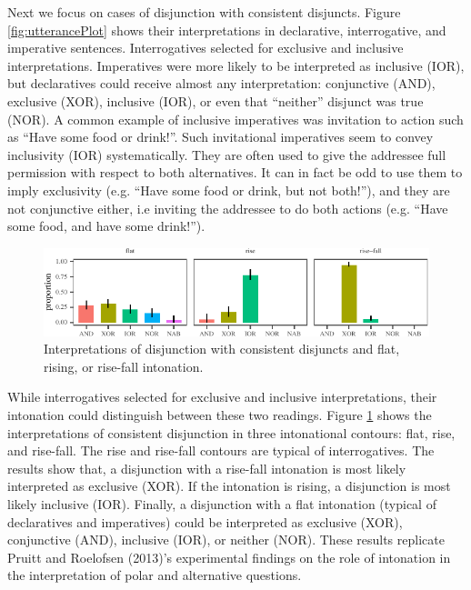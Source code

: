 \documentclass[,man,floatsintext]{apa6}
\begin{document}
Next we focus on cases of disjunction with consistent disjuncts. Figure \ref{fig:utterancePlot} shows their interpretations in declarative, interrogative, and imperative sentences. Interrogatives selected for exclusive and inclusive interpretations. Imperatives were more likely to be interpreted as inclusive (IOR), but declaratives could receive almost any interpretation: conjunctive (AND), exclusive (XOR), inclusive (IOR), or even that \enquote{neither} disjunct was true (NOR). A common example of inclusive imperatives was invitation to action such as \enquote{Have some food or drink!}. Such invitational imperatives seem to convey inclusivity (IOR) systematically. They are often used to give the addressee full permission with respect to both alternatives. It can in fact be odd to use them to imply exclusivity (e.g. \enquote{Have some food or drink, but not both!}), and they are not conjunctive either, i.e inviting the addressee to do both actions (e.g. \enquote{Have some food, and have some drink!}).

\begin{figure}[tb]

{\centering \includegraphics{figs/intonationPlot-1} 

}

\caption{Interpretations of disjunction with consistent disjuncts and flat, rising, or rise-fall intonation.}\label{fig:intonationPlot}
\end{figure}

While interrogatives selected for exclusive and inclusive interpretations, their intonation could distinguish between these two readings. Figure \ref{fig:intonationPlot} shows the interpretations of consistent disjunction in three intonational contours: flat, rise, and rise-fall. The rise and rise-fall contours are typical of interrogatives. The results show that, a disjunction with a rise-fall intonation is most likely interpreted as exclusive (XOR). If the intonation is rising, a disjunction is most likely inclusive (IOR). Finally, a disjunction with a flat intonation (typical of declaratives and imperatives) could be interpreted as exclusive (XOR), conjunctive (AND), inclusive (IOR), or neither (NOR). These results replicate Pruitt and Roelofsen (2013)'s experimental findings on the role of intonation in the interpretation of polar and alternative questions.
\end{document}
